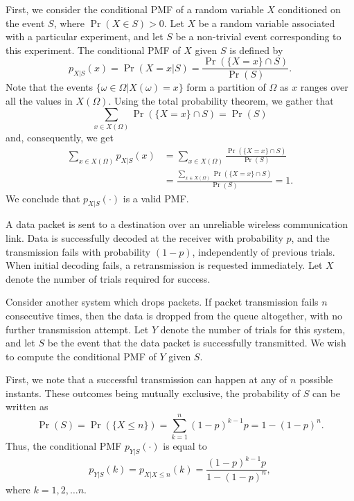 First, we consider the conditional PMF of a random variable $X$ conditioned on the event $S$, where $\Pr (X \in S) > 0$.
Let $X$ be a random variable associated with a particular experiment, and let $S$ be a non-trivial event corresponding to this experiment.
The conditional PMF of $X$ given $S$ is defined by
\begin{equation} \label{equation:ConditionalEventPMF}
p_{X|S} (x) = \Pr (X = x | S)
= \frac{\Pr (\{X = x\} \cap S)}{\Pr (S)} .
\end{equation}
Note that the events $\{ \omega \in \Omega |  X(\omega) = x \}$ form a partition of $\Omega$ as $x$ ranges over all the values in $X (\Omega)$.
Using the total probability theorem, we gather that
\begin{equation*}
\sum_{x \in X(\Omega)} \Pr ( \{X = x\} \cap S) = \Pr (S)
\end{equation*}
and, consequently, we get
\begin{equation*}
\begin{split}
\sum_{x \in X(\Omega)} p_{X|S} (x)
&= \sum_{x \in X(\Omega)} \frac{\Pr (\{X = x\} \cap S)}{\Pr (S)} \\
&= \frac{\sum_{x \in X(\Omega)} \Pr (\{X = x\} \cap S)}{\Pr (S)}
=1 .
\end{split}
\end{equation*}
We conclude that $p_{X|S} (\cdot)$ is a valid PMF.

\begin{example}
A data packet is sent to a destination over an unreliable wireless communication link.
Data is successfully decoded at the receiver with probability $p$, and the transmission fails with probability $(1-p)$, independently of previous trials.
When initial decoding fails, a retransmission is requested immediately.
Let $X$ denote the number of trials required for success.

Consider another system which drops packets.
If packet transmission fails $n$ consecutive times, then the data is dropped from the queue altogether, with no further transmission attempt.
Let $Y$ denote the number of trials for this system, and let $S$ be the event that the data packet is successfully transmitted.
We wish to compute the conditional PMF of $Y$ given $S$.

First, we note that a successful transmission can happen at any of $n$ possible instants.
These outcomes being mutually exclusive, the probability of $S$ can be written as
\begin{equation*}
\Pr(S) = \Pr(\{X\leq n \}) = \sum_{k=1}^n (1-p)^{k-1} p = 1 - (1-p)^n .
\end{equation*}
Thus, the conditional PMF $p_{Y|S} (\cdot)$ is equal to
\begin{equation*}
p_{Y|S} (k) = p_{X|X\leq n} (k) = \frac{ (1-p)^{k-1} p }{1 - (1-p)^n} ,
\end{equation*}
where $k = 1, 2, \ldots n$.
\end{example}

